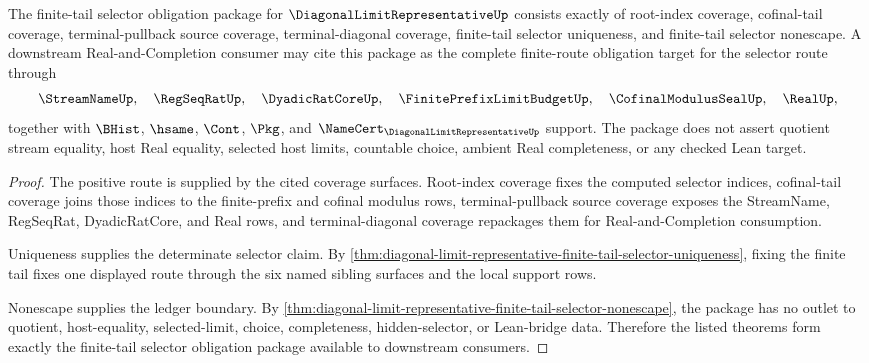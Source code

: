 \begin{theorem}
\label{thm:diagonal-limit-representative-finite-tail-selector-obligation-package}
The finite-tail selector obligation package for $\DiagonalLimitRepresentativeUp$ consists exactly of root-index coverage, cofinal-tail coverage, terminal-pullback source coverage, terminal-diagonal coverage, finite-tail selector uniqueness, and finite-tail selector nonescape. A downstream Real-and-Completion consumer may cite this package as the complete finite-route obligation target for the selector route through
$$
\StreamNameUp,\quad \RegSeqRatUp,\quad \DyadicRatCoreUp,\quad \FinitePrefixLimitBudgetUp,\quad \CofinalModulusSealUp,\quad \RealUp,
$$
together with $\BHist$, $\hsame$, $\Cont$, $\Pkg$, and $\NameCert_{\DiagonalLimitRepresentativeUp}$ support. The package does not assert quotient stream equality, host Real equality, selected host limits, countable choice, ambient Real completeness, or any checked Lean target.
\end{theorem}
\begin{proof}
The positive route is supplied by the cited coverage surfaces. Root-index coverage fixes the computed selector indices, cofinal-tail coverage joins those indices to the finite-prefix and cofinal modulus rows, terminal-pullback source coverage exposes the StreamName, RegSeqRat, DyadicRatCore, and Real rows, and terminal-diagonal coverage repackages them for Real-and-Completion consumption.

Uniqueness supplies the determinate selector claim. By \autoref{thm:diagonal-limit-representative-finite-tail-selector-uniqueness}, fixing the finite tail fixes one displayed route through the six named sibling surfaces and the local support rows.

Nonescape supplies the ledger boundary. By \autoref{thm:diagonal-limit-representative-finite-tail-selector-nonescape}, the package has no outlet to quotient, host-equality, selected-limit, choice, completeness, hidden-selector, or Lean-bridge data. Therefore the listed theorems form exactly the finite-tail selector obligation package available to downstream consumers.
\end{proof}
